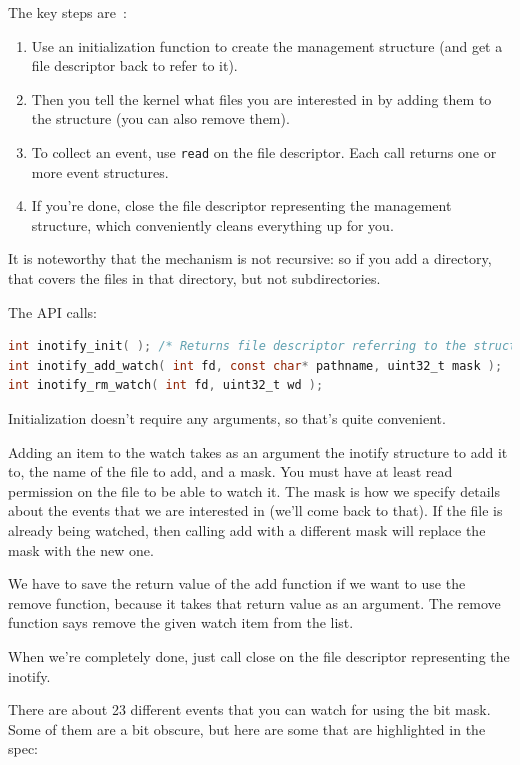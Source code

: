 \documentclass[a4paper]{report}
\begin{document}
The key steps are~\cite{lpi}:
\begin{enumerate}
	\item Use an initialization function to create the management structure (and get a file descriptor back to refer to it).
	\item Then you tell the kernel what files you are interested in by adding them to the structure (you can also remove them).
	\item To collect an event, use \texttt{read} on the file descriptor. Each call returns one or more event structures.
	\item If you're done, close the file descriptor representing the management structure, which conveniently cleans everything up for you.
\end{enumerate}

It is noteworthy that the mechanism is not recursive: so if you add a directory, that covers the files in that directory, but not subdirectories.

The API calls:
\begin{lstlisting}[language=C]
int inotify_init( ); /* Returns file descriptor referring to the struct */
int inotify_add_watch( int fd, const char* pathname, uint32_t mask );
int inotify_rm_watch( int fd, uint32_t wd );
\end{lstlisting}

Initialization doesn't require any arguments, so that's quite convenient.

Adding an item to the watch takes as an argument the inotify structure to add it to, the name of the file to add, and a mask. You must have at least read permission on the file to be able to watch it. The mask is how we specify details about the events that we are interested in (we'll come back to that). If the file is already being watched, then calling add with a different mask will replace the mask with the new one.

We have to save the return value of the add function if we want to use the remove function, because it takes that return value as an argument. The remove function says remove the given watch item from the list.

When we're completely done, just call close on the file descriptor representing the inotify.

There are about 23 different events that you can watch for using the bit mask. Some of them are a bit obscure, but here are some that are highlighted in the spec:
\end{document}
